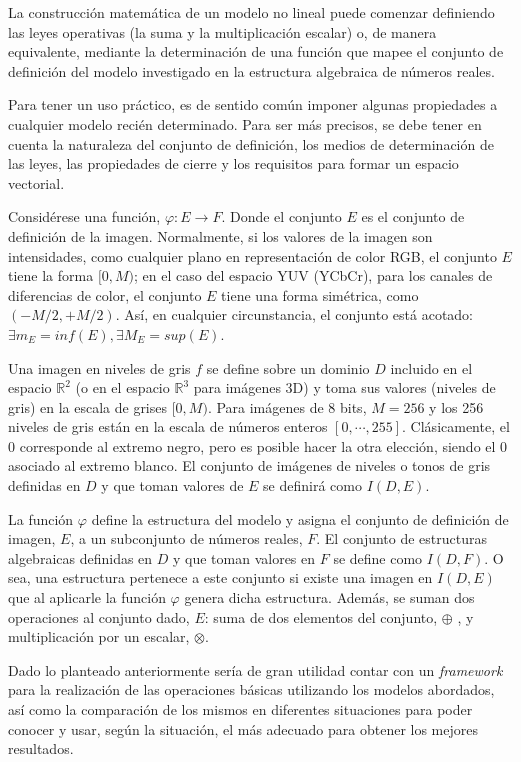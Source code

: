 La construcción matemática de un modelo no lineal puede comenzar definiendo las leyes operativas (la suma y la multiplicación escalar) o, de manera equivalente, mediante la determinación de una función que mapee el conjunto de definición del modelo investigado en la estructura algebraica de números reales.

Para tener un uso práctico, es de sentido común imponer algunas propiedades a cualquier modelo recién determinado. Para ser más precisos, se debe tener en cuenta la naturaleza del conjunto de definición, los medios de determinación de las leyes, las propiedades de cierre y los requisitos para formar un espacio vectorial. 

Consid\'erese una función, $\varphi : E \rightarrow F$. Donde el conjunto $E$ es el conjunto de definición de la imagen. Normalmente, si los valores de la imagen son intensidades, como cualquier plano en representación de color RGB, el conjunto $E$ tiene la forma $[0,M)$; en el caso del espacio YUV (YCbCr), para los canales de diferencias de color, el conjunto $E$ tiene una forma simétrica, como $( - M/2 , + M/2 )$. Así, en cualquier circunstancia, el conjunto está acotado: $\exists m_E=inf(E),\exists M_E=sup(E)$.

Una imagen en niveles de gris $f$ se define sobre un dominio $D$ incluido en el espacio $\mathbb{R}^2$ (o en el espacio $\mathbb{R}^3$  para imágenes 3D) y toma sus valores (niveles de gris) en la escala de grises $[0, M)$. Para imágenes de 8 bits, $ M = 256$ y los 256 niveles de gris están en la escala de números enteros $[0,\cdots, 255]$. Clásicamente, el 0 corresponde al extremo negro, pero es posible hacer la otra elección, siendo el 0 asociado al extremo blanco. El conjunto de imágenes de niveles o tonos de gris definidas en $D$ y que toman valores de $E$ se definir\'a como $I(D,E)$.

La función $\varphi$ define la estructura del modelo y asigna el conjunto de definición de imagen, $E$, a un subconjunto de números reales, $F$. El conjunto de estructuras algebraicas definidas en $D$ y que toman valores en $F$ se define como $I(D,F)$. O sea, una estructura pertenece a este conjunto si existe una imagen en $I(D,E)$ que al aplicarle la funci\'on $\varphi$ genera dicha estructura. Además, se suman dos operaciones al conjunto dado, $E$: suma de dos elementos del conjunto, $\oplus$ , y multiplicación por un escalar, $\otimes$.  

Dado lo planteado anteriormente ser\'ia de gran utilidad contar con un \textit{framework} para la realizaci\'on de las operaciones b\'asicas utilizando los modelos abordados, as\'i como la comparaci\'on de los mismos en diferentes situaciones para poder conocer y usar, seg\'un la situaci\'on, el m\'as adecuado para obtener los mejores resultados.

